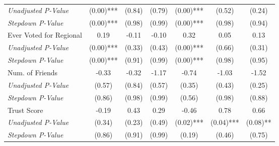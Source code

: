 \begin{tabular}{l c c c c c c}
\quad \textit{Unadjusted P-Value} & (0.00)*** & (0.84) & (0.79) & (0.00)*** & (0.52) & (0.24) \\
\quad \textit{Stepdown P-Value} & (0.00)*** & (0.98) & (0.99) & (0.00)*** & (0.98) & (0.94) \\
Ever Voted for Regional & 0.19 & -0.11 & -0.10 & 0.32 & 0.05 & 0.13 \\
\quad \textit{Unadjusted P-Value} & (0.00)*** & (0.33) & (0.43) & (0.00)*** & (0.66) & (0.31) \\
\quad \textit{Stepdown P-Value} & (0.00)*** & (0.91) & (0.99) & (0.00)*** & (0.98) & (0.95) \\
Num. of Friends & -0.33 & -0.32 & -1.17 & -0.74 & -1.03 & -1.52 \\
\quad \textit{Unadjusted P-Value} & (0.57) & (0.84) & (0.57) & (0.35) & (0.43) & (0.25) \\
\quad \textit{Stepdown P-Value} & (0.86) & (0.98) & (0.99) & (0.56) & (0.98) & (0.88) \\
Trust Score & -0.19 & 0.43 & 0.29 & -0.46 & 0.78 & 0.66 \\
\quad \textit{Unadjusted P-Value} & (0.34) & (0.23) & (0.49) & (0.02)*** & (0.04)*** & (0.08)** \\
\quad \textit{Stepdown P-Value} & (0.86) & (0.91) & (0.99) & (0.19) & (0.46) & (0.75) \\
\bottomrule
\end{tabular}
